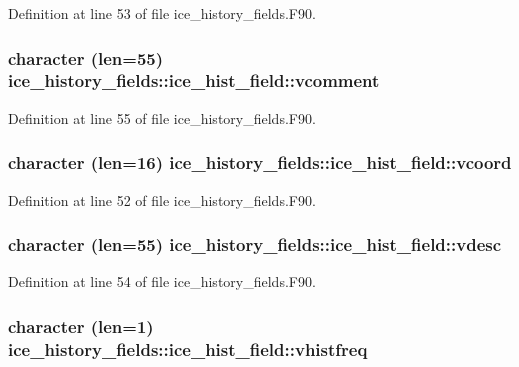 Definition at line 53 of file ice\_\-history\_\-fields.F90.\hypertarget{typeice__history__fields_1_1ice__hist__field_a7c59735f84c14cdcf0daeb2b9be6ddd5}{
\subsubsection[{vcomment}]{\setlength{\rightskip}{0pt plus 5cm}character (len=55) {\bf ice\_\-history\_\-fields::ice\_\-hist\_\-field::vcomment}}}
\label{typeice__history__fields_1_1ice__hist__field_a7c59735f84c14cdcf0daeb2b9be6ddd5}


Definition at line 55 of file ice\_\-history\_\-fields.F90.\hypertarget{typeice__history__fields_1_1ice__hist__field_a71b2470ab85a9fc5cd066d1cf5abb119}{
\subsubsection[{vcoord}]{\setlength{\rightskip}{0pt plus 5cm}character (len=16) {\bf ice\_\-history\_\-fields::ice\_\-hist\_\-field::vcoord}}}
\label{typeice__history__fields_1_1ice__hist__field_a71b2470ab85a9fc5cd066d1cf5abb119}


Definition at line 52 of file ice\_\-history\_\-fields.F90.\hypertarget{typeice__history__fields_1_1ice__hist__field_a630f9712d30236f4011a6b0395ef2ac3}{
\subsubsection[{vdesc}]{\setlength{\rightskip}{0pt plus 5cm}character (len=55) {\bf ice\_\-history\_\-fields::ice\_\-hist\_\-field::vdesc}}}
\label{typeice__history__fields_1_1ice__hist__field_a630f9712d30236f4011a6b0395ef2ac3}


Definition at line 54 of file ice\_\-history\_\-fields.F90.\hypertarget{typeice__history__fields_1_1ice__hist__field_aff4b72a08bea525266b3525041667203}{
\subsubsection[{vhistfreq}]{\setlength{\rightskip}{0pt plus 5cm}character (len=1) {\bf ice\_\-history\_\-fields::ice\_\-hist\_\-field::vhistfreq}}}
\label{typeice__history__fields_1_1ice__hist__field_aff4b72a08bea525266b3525041667203}


